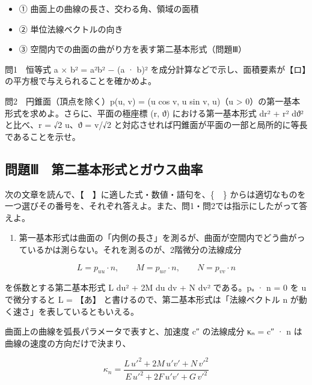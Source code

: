 \documentclass[
  10pt,
  a4paper,
]{article}
\providecommand{\tightlist}{%
  \setlength{\itemsep}{0pt}\setlength{\parskip}{0pt}}
\begin{document}
\begin{itemize}
\tightlist
\item
  ① 曲面上の曲線の長さ、交わる角、領域の面積
\item
  ② 単位法線ベクトルの向き
\item
  ③ 空間内での曲面の曲がり方を表す第二基本形式（問題Ⅲ）
\end{itemize}

問1　恒等式 \textbar a × b\textbar² =
\textbar a\textbar²\textbar b\textbar² − (a · b)²
を成分計算などで示し、面積要素が【ロ】の平方根で与えられることを確かめよ。

問2　円錐面（頂点を除く）p(u, v) = (u cos v, u sin v, u)（u
\textgreater{} 0）の第一基本形式を求めよ。さらに、平面の極座標 (r,
{\fallbackfont ϑ}) における第一基本形式 dr² + r² d{\fallbackfont ϑ}²
と比べ、r = √2 u、{\fallbackfont ϑ} = v/√2
と対応させれば円錐面が平面の一部と局所的に等長であることを示せ。

\hypertarget{ux554fux984cux2172-ux7b2cux4e8cux57faux672cux5f62ux5f0fux3068ux30acux30a6ux30b9ux66f2ux7387}{%
\subsection{問題Ⅲ　第二基本形式とガウス曲率}\label{ux554fux984cux2172-ux7b2cux4e8cux57faux672cux5f62ux5f0fux3068ux30acux30a6ux30b9ux66f2ux7387}}

次の文章を読んで、【　】に適した式・数値・語句を、\{　\}
からは適切なものを一つ選びその番号を、それぞれ答えよ。また、問1・問2では指示にしたがって答えよ。

\begin{enumerate}
\def\labelenumi{(\arabic{enumi})}
\tightlist
\item
  第一基本形式は曲面の「内側の長さ」を測るが、曲面が空間内でどう曲がっているかは測らない。それを測るのが、2階微分の法線成分
\end{enumerate}

\[L = p_{uu} \cdot n, \qquad M = p_{uv} \cdot n, \qquad N = p_{vv} \cdot n\]

を係数とする第二基本形式 L du² + 2M du dv + N dv²
である。p{\fallbackfont ᵤ} · n = 0 を u で微分すると L = 【あ】
と書けるので、第二基本形式は「法線ベクトル n
が動く速さ」を表しているともいえる。

曲面上の曲線を弧長パラメータで表すと、加速度 c″ の法線成分
κ{\fallbackfont ₙ} = c″ · n は曲線の速度の方向だけで決まり、

\[\kappa_n = \frac{L\,u'^2 + 2M\,u'v' + N\,v'^2}{E\,u'^2 + 2F\,u'v' + G\,v'^2}\]
\end{document}

